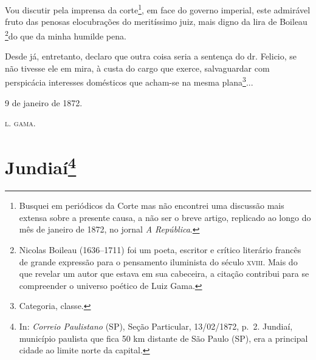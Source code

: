 {Vou discutir pela imprensa da corte\footnote{ Busquei em periódicos da
  Corte mas não encontrei uma discussão mais extensa sobre a presente
  causa, a não ser o breve artigo, replicado ao longo do mês de janeiro
  de 1872, no jornal \emph{A República}.}, em face do governo imperial,
este admirável fruto das penosas elocubrações do meritíssimo juiz, mais
digno da lira de Boileau \footnote{ Nicolas Boileau (1636--1711) foi um
  poeta, escritor e crítico literário francês de grande expressão para o
  pensamento iluminista do século \textsc{xviii}. Mais do que revelar um autor
  que estava em sua cabeceira, a citação contribui para se compreender o
  universo poético de Luiz Gama.}do que da minha humilde pena.

Desde já, entretanto, declaro que outra coisa seria a sentença do dr.
Felicio, se não tivesse ele em mira, à custa do cargo que exerce,
salvaguardar com perspicácia interesses domésticos que acham-se na mesma
plana\footnote{ Categoria, classe.}...
\begin{flushright}
9 de janeiro de 1872.

\textsc{l. gama}.
\end{flushright}
\chapter{Jundiaí\footnote{ In: \emph{Correio Paulistano} (SP), Seção Particular,
  13/02/1872, p.~2. Jundiaí, município paulista que fica 50 km distante
  de São Paulo (SP), era a principal cidade ao limite norte da capital.} }%

}
